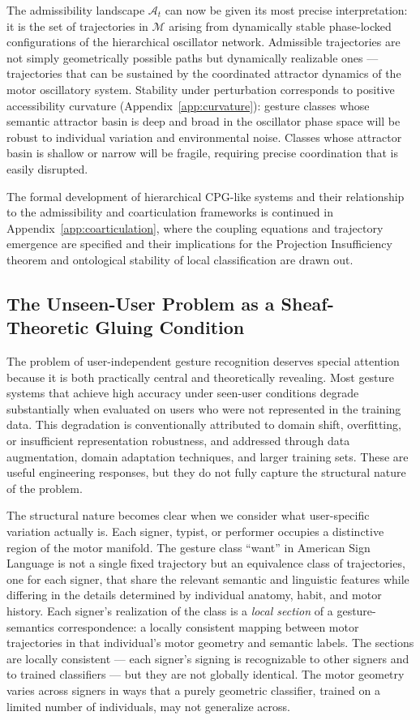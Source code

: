 \documentclass[11pt, a4paper]{article}
\theoremstyle{definition}
\begin{document}
The admissibility landscape $\mathcal{A}_t$ can now be given its most precise interpretation: it is the set of trajectories in $\mathcal{M}$ arising from dynamically stable phase-locked configurations of the hierarchical oscillator network. Admissible trajectories are not simply geometrically possible paths but dynamically realizable ones --- trajectories that can be sustained by the coordinated attractor dynamics of the motor oscillatory system. Stability under perturbation corresponds to positive accessibility curvature (Appendix~\ref{app:curvature}): gesture classes whose semantic attractor basin is deep and broad in the oscillator phase space will be robust to individual variation and environmental noise. Classes whose attractor basin is shallow or narrow will be fragile, requiring precise coordination that is easily disrupted.

The formal development of hierarchical CPG-like systems and their relationship to the admissibility and coarticulation frameworks is continued in Appendix~\ref{app:coarticulation}, where the coupling equations and trajectory emergence are specified and their implications for the Projection Insufficiency theorem and ontological stability of local classification are drawn out.

\subsection{The Unseen-User Problem as a Sheaf-Theoretic Gluing Condition}

The problem of user-independent gesture recognition deserves special attention because it is both practically central and theoretically revealing. Most gesture systems that achieve high accuracy under seen-user conditions degrade substantially when evaluated on users who were not represented in the training data. This degradation is conventionally attributed to domain shift, overfitting, or insufficient representation robustness, and addressed through data augmentation, domain adaptation techniques, and larger training sets. These are useful engineering responses, but they do not fully capture the structural nature of the problem.

The structural nature becomes clear when we consider what user-specific variation actually is. Each signer, typist, or performer occupies a distinctive region of the motor manifold. The gesture class ``want'' in American Sign Language is not a single fixed trajectory but an equivalence class of trajectories, one for each signer, that share the relevant semantic and linguistic features while differing in the details determined by individual anatomy, habit, and motor history. Each signer's realization of the class is a \emph{local section} of a gesture-semantics correspondence: a locally consistent mapping between motor trajectories in that individual's motor geometry and semantic labels. The sections are locally consistent --- each signer's signing is recognizable to other signers and to trained classifiers --- but they are not globally identical. The motor geometry varies across signers in ways that a purely geometric classifier, trained on a limited number of individuals, may not generalize across.
\end{document}

